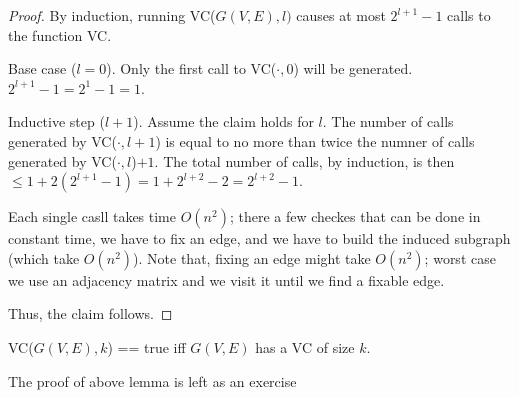     \begin{proof}
        By induction, running VC($G(V,E), l)$ causes at most $2^{l+1} - 1$ calls to the function VC.

        Base case ($l = 0$). Only the first call to VC($\cdot, 0$) will be generated. $2^{l+1} - 1 = 2^1 - 1 = 1$.

        Inductive step ($l+1$). Assume the claim holds for $l$. The number of calls generated by VC($\cdot, l+1$) is equal to no more than twice the numner of calls generated by VC($\cdot, l$)$+1$.
        The total number of calls, by induction, is then $\leq 1 + 2(2^{l+1}-1) = 1 + 2^{l+2} - 2 = 2^{l+2} - 1$.

        Each single casll takes time $O(n^2)$; there a few checkes that can be done in constant time, we have to fix an edge, and we have to build the induced subgraph (which take $O(n^2)$).
        Note that, fixing an edge might take $O(n^2)$; worst case we use an adjacency matrix and we visit it until we find a fixable edge.

        Thus, the claim follows.
    \end{proof}

    \begin{lemma}
        VC($G(V,E), k$) == true iff $G(V,E)$ has a VC of size $k$.
    \end{lemma}

    \begin{exercise}
        The proof of above lemma is left as an exercise
    \end{exercise}